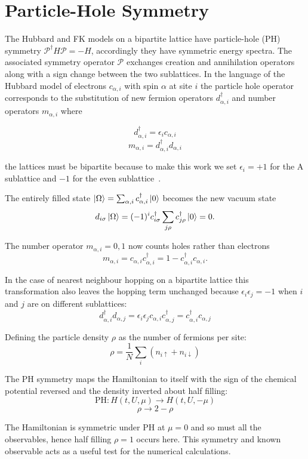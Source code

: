 \hypertarget{particle-hole-symmetry}{%
\section{Particle-Hole Symmetry}\label{particle-hole-symmetry}}

The Hubbard and FK models on a bipartite lattice have particle-hole (PH) symmetry \(\mathcal{P}^\dagger H \mathcal{P} = - H\), accordingly they have symmetric energy spectra. The associated symmetry operator \(\mathcal{P}\) exchanges creation and annihilation operators along with a sign change between the two sublattices. In the language of the Hubbard model of electrons \(c_{\alpha,i}\) with spin \(\alpha\) at site \(i\) the particle hole operator corresponds to the substitution of new fermion operators \(d^\dagger_{\alpha,i}\) and number operators \(m_{\alpha,i}\) where

\[d^\dagger_{\alpha,i} = \epsilon_i c_{\alpha,i}\] \[m_{\alpha,i} = d^\dagger_{\alpha,i}d_{\alpha,i}\]

the lattices must be bipartite because to make this work we set \(\epsilon_i = +1\) for the A sublattice and \(-1\) for the even sublattice~\autocite{gruberFalicovKimballModel2006}.

The entirely filled state \(\ket{\Omega} = \sum_{\alpha,i} c^\dagger_{\alpha,i} \ket{0}\) becomes the new vacuum state \[d_{i\sigma} \ket{\Omega} = (-1)^i c^\dagger_{i\sigma} \sum_{j\rho} c^\dagger_{j\rho} \ket{0} = 0.\]

The number operator \(m_{\alpha,i} = 0,1\) now counts holes rather than electrons \[ m_{\alpha,i} = c_{\alpha,i} c^\dagger_{\alpha,i} = 1 - c^\dagger_{\alpha,i} c_{\alpha,i}.\]

In the case of nearest neighbour hopping on a bipartite lattice this transformation also leaves the hopping term unchanged because \(\epsilon_i \epsilon_j = -1\) when \(i\) and \(j\) are on different sublattices: \[ d^\dagger_{\alpha,i} d_{\alpha,j} = \epsilon_i \epsilon_j c_{\alpha,i} c^\dagger_{\alpha,j} = c^\dagger_{\alpha,i} c_{\alpha,j} \]

Defining the particle density \(\rho\) as the number of fermions per site: \[
    \rho = \frac{1}{N} \sum_i \left( n_{i \uparrow} + n_{i \downarrow} \right)
\]

The PH symmetry maps the Hamiltonian to itself with the sign of the chemical potential reversed and the density inverted about half filling: \[ \text{PH} : H(t, U, \mu) \rightarrow H(t, U, -\mu) \] \[ \rho \rightarrow 2 - \rho \]

The Hamiltonian is symmetric under PH at \(\mu = 0\) and so must all the observables, hence half filling \(\rho = 1\) occurs here. This symmetry and known observable acts as a useful test for the numerical calculations.
